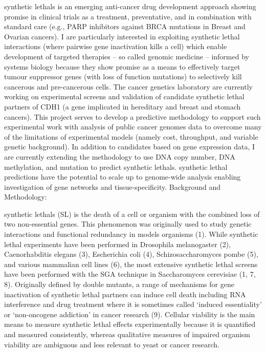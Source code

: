 \Glspl{synthetic lethal} is an emerging anti-cancer drug development approach showing promise in clinical trials as a treatment, preventative, and in combination with standard care (e.g., PARP inhibitors against BRCA \glspl{mutation} in Breast and Ovarian cancers). I are particularly interested in exploiting \gls{synthetic lethal} interactions (where pairwise gene inactivation kills a cell) which enable development of targeted therapies – so called genomic medicine – informed by systems biology because they show promise as a means to effectively target \gls{tumour suppressor} genes (with loss of function \glspl{mutation}) to selectively kill cancerous and pre-cancerous cells. The cancer genetics laboratory are currently working on experimental screens and validation of candidate \gls{synthetic lethal} partners of CDH1 (a gene implicated in \gls{hereditary} and  breast and stomach cancers). This project serves to develop a predictive methodology to support such experimental work with analysis of public cancer \glspl{genome} data to overcome many of the limitations of experimental models (namely cost, throughput, and variable genetic background). In addition to candidates based on \gls{gene expression} data, I are currently extending the methodology to use \acrshort{DNA} copy number, \acrshort{DNA} methylation, and  \gls{mutation} to predict \glspl{synthetic lethal}. \Gls{synthetic lethal} predictions have the potential to scale up to \gls{genome}-wide analysis enabling investigation of gene networks and tissue-specificity.
Background and Methodology:

\Glspl{synthetic lethal} (SL) is the death of a cell or organism with the combined loss of two non-\gls{essential} genes. This phenomenon was originally used to study genetic interactions and \gls{functional redundancy} in models organisms (1). While \gls{synthetic lethal} experiments have been performed in Drosophila melanogaster (2), Caenorhabditis elegans (3), Escherichia coli (4), Schizosaccharomyces pombe (5), and various mammalian cell lines (6), the most extensive \gls{synthetic lethal} screens have been performed with the \gls{SGA} technique in Saccharomyces cerevisiae (1, 7, 8). Originally defined by double \glspl{mutant}, a range of mechanisms for gene inactivation of \gls{synthetic lethal} partners can induce cell death including \acrshort{RNA} interference and drug treatment where it is sometimes called ‘\gls{induced essentiality}’ or ‘\gls{non-oncogene addiction}’ in cancer research (9). Cellular viability is the main means to measure \gls{synthetic lethal} effects experimentally because it is quantified and measured consistently, whereas qualitative measures of impaired organism viability are ambiguous and less relevant to yeast or cancer research.

